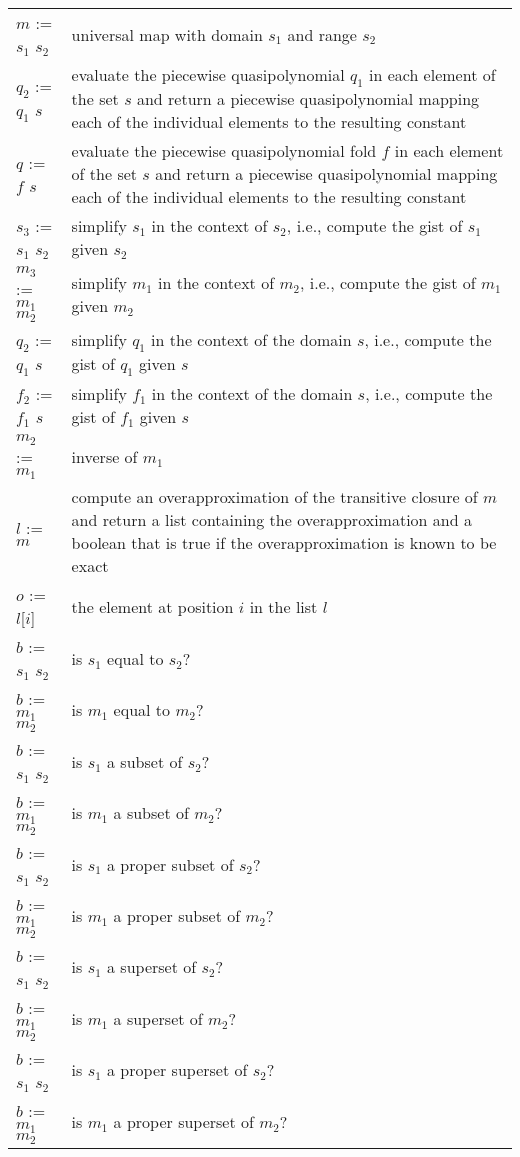 \begin{supertabular}{lp{0.7\textwidth}}
\\
$m$ := $s_1$ \ai[\tt]{->} $s_2$ & universal map with domain $s_1$
and range $s_2$
\\
$q_2$ := $q_1$  $s$ &
evaluate the piecewise quasipolynomial $q_1$ in each element
of the set $s$ and return a piecewise quasipolynomial
mapping each of the individual elements to the resulting
constant
\\
$q$ := $f$  $s$ &
evaluate the piecewise quasipolynomial fold $f$ in each element
of the set $s$ and return a piecewise quasipolynomial
mapping each of the individual elements to the resulting
constant
\\
$s_3$ := $s_1$ \ai[\tt]{\%} $s_2$ &
simplify $s_1$ in the context of $s_2$, i.e., compute
the gist of $s_1$ given $s_2$
\\
$m_3$ := $m_1$ \ai[\tt]{\%} $m_2$ &
simplify $m_1$ in the context of $m_2$, i.e., compute
the gist of $m_1$ given $m_2$
\\
$q_2$ := $q_1$ \ai[\tt]{\%} $s$ &
simplify $q_1$ in the context of the domain $s$, i.e., compute
the gist of $q_1$ given $s$
\\
$f_2$ := $f_1$ \ai[\tt]{\%} $s$ &
simplify $f_1$ in the context of the domain $s$, i.e., compute
the gist of $f_1$ given $s$
\\
$m_2$ := $m_1$ & inverse of $m_1$
\\
$l$ := $m$\ai[\tt]{\^{}+} &
compute an overapproximation of the transitive closure
of $m$ and return a list containing the overapproximation
and a boolean that is true if the overapproximation
is known to be exact
\\
$o$ := $l$[$i$] &
the element at position $i$ in the list $l$
\\
$b$ := $s_1$ \ai[\tt]{=} $s_2$ & is $s_1$ equal to $s_2$?
\\
$b$ := $m_1$ \ai[\tt]{=} $m_2$ & is $m_1$ equal to $m_2$?
\\
$b$ := $s_1$ \ai[\tt]{<=} $s_2$ & is $s_1$ a subset of $s_2$?
\\
$b$ := $m_1$ \ai[\tt]{<=} $m_2$ & is $m_1$ a subset of $m_2$?
\\
$b$ := $s_1$ \ai[\tt]{<} $s_2$ & is $s_1$ a proper subset of $s_2$?
\\
$b$ := $m_1$ \ai[\tt]{<} $m_2$ & is $m_1$ a proper subset of $m_2$?
\\
$b$ := $s_1$ \ai[\tt]{>=} $s_2$ & is $s_1$ a superset of $s_2$?
\\
$b$ := $m_1$ \ai[\tt]{>=} $m_2$ & is $m_1$ a superset of $m_2$?
\\
$b$ := $s_1$ \ai[\tt]{>} $s_2$ & is $s_1$ a proper superset of $s_2$?
\\
$b$ := $m_1$ \ai[\tt]{>} $m_2$ & is $m_1$ a proper superset of $m_2$?
\\
\end{supertabular}
